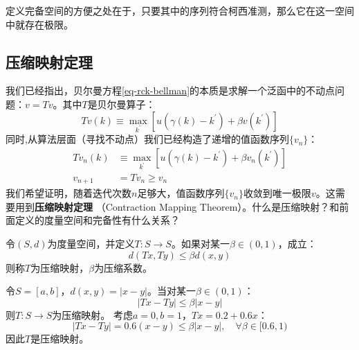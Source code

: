 定义完备空间的方便之处在于，只要其中的序列符合柯西准测，那么它在这一空间中就存在极限。


\subsection{压缩映射定理}

我们已经指出，贝尔曼方程\cref{eq-rck-bellman}的本质是求解一个泛函中的不动点问题：$v=Tv$。其中$T$是贝尔曼算子：
\begin{equation*}
    Tv\left(k\right) \equiv \max_{k^{\prime}} 
        \left[u\left(\gamma\left(k\right)-k^{\prime}\right)+\beta v\left(k^{\prime}\right)\right]
\end{equation*}
同时,从算法层面（寻找不动点）我们已经构造了递增的值函数序列$\{v_n\}$：
\begin{equation*}
    \begin{aligned}
        Tv_n\left(k\right) &\equiv \max _{k^{\prime}} 
            \left[u\left(\gamma\left(k\right)-k^{\prime}\right)+\beta v_n\left(k^{\prime}\right)\right] \\
        v_{n+1} &= Tv_n \geq v_n
    \end{aligned}
\end{equation*}
我们希望证明，随着迭代次数$n$足够大，值函数序列$\{v_n\}$收敛到唯一极限$v$。这需要用到\textbf{压缩映射定理}
（Contraction Mapping Theorem）。什么是压缩映射？和前面定义的度量空间和完备性有什么关系？

\begin{definition}
    令$\left(S,d\right)$为度量空间，并定义$T:S\rightarrow S$。如果对某一$\beta \in \left(0,1\right)$，成立：
    \begin{equation*}
        d\left(Tx,Ty\right) \leq \beta d\left(x,y\right)
    \end{equation*}
    则称$T$为压缩映射，$\beta$为压缩系数。
\end{definition}
\begin{example}
    令$S=\left[a,b\right]$，$d\left(x,y\right)=\left|x-y\right|$。当对某一$\beta \in \left(0,1\right)$：
    \begin{equation*}
        \left|Tx-Ty\right|\leq \beta \left|x-y\right|
    \end{equation*}
    则$T:S\rightarrow S$为压缩映射。
    考虑$a=0,b=1$，$Tx=0.2+0.6x$：
    \begin{equation*}
         \left|Tx-Ty\right|=0.6\left(x-y\right)\leq \beta\left|x-y\right|,\quad \forall \beta \in [0.6,1)
    \end{equation*}
    因此$T$是压缩映射。
\end{example}

